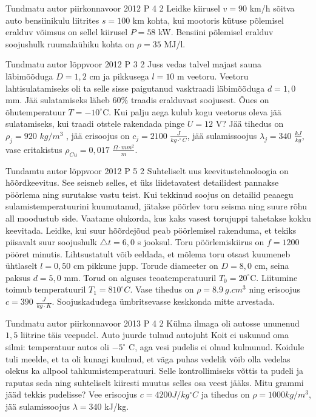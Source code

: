 \documentclass[11pt]{article}
\begin{document}
{%
{Tundmatu autor} %
{piirkonnavoor} %
{2012} %
{P 4} %
{2} %
{
\ifStatement
Leidke kiirusel $v = 90$ km/h sõitva auto bensiinikulu liitrites $s = 100$ km kohta, kui mootoris kütuse põlemisel eralduv  võimsus on sellel kiirusel $P = 58$ kW. Bensiini põlemisel eralduv soojushulk ruumalaühiku kohta on $\rho = 35$ MJ/l.
\fi
}

{Tundmatu autor} %
{lõppvoor} %
{2012} %
{P 3} %
{2} %
{
\ifStatement
Juss vedas talvel majast sauna läbimõõduga $D = 1,2$ cm ja pikkusega $l = 10$ m veetoru. Veetoru lahtisulatamiseks oli ta selle sisse paigutanud vasktraadi läbimõõduga $d = 1,0$ mm. Jää sulatamiseks läheb $60\%$ traadis eralduvast soojusest. Õues on õhutemperatuur $T = -10^{\circ}$C. Kui palju aega kulub kogu veetorus oleva jää sulatamiseks, kui traadi otstele rakendada pinge $U = 12$ V? Jää tihedus on $\rho_j = 920 $ $kg/m^3$ , jää erisoojus on $c_j = 2100$ $\frac{J}{kg \cdot ^{\circ} C}$, jää sulamissoojus $\lambda_j = 340$ $\frac{kJ}{kg}$, vase eritakistus $\rho_{Cu} = 0,017$ $\frac{\Omega \cdot mm^2}{m}$.
\fi
}

{Tundamtu autor} %
{lõppvoor} %
{2012} %
{P 5} %
{2} %
{
\ifStatement
Suhteliselt uus keevitustehnoloogia on hõõrdkeevitus. See seisneb selles, et üks liidetavatest detailidest pannakse pöörlema ning surutakse vastu teist. Kui tekkinud soojus on detailid peaaegu sulamistemperatuurini kuumutanud, jätakse pöörlev toru seisma ning suure rõhu all moodustub side. Vaatame olukorda, kus kaks vasest torujuppi tahetakse kokku keevitada. Leidke, kui suur hõõrdejõud peab pöörlemisel rakenduma, et tekiks piisavalt suur soojushulk $\triangle t = 6,0$ s jooksul. Toru pöörlemiskiirus on $f = 1200$ pööret minutis. Lihtsustatult võib eeldada, et mõlema toru otsast kuumeneb ühtlaselt $l = 0,50$ cm pikkune jupp. Torude diameeter on $D = 8,0$ cm, seina paksus $d = 5,0$ mm. Torud on alguses teoatemperatuuril $T_0 = 20^{\circ}$C. Liitumine toimub temperatuuril $T_1 = 810^{\circ}C$. Vase tihedus on $\rho = \SI{8.9}{g.cm^3}$ ning erisoojus $c = 390$ $\frac{J}{kg \cdot K}$. Soojuskadudega ümbritsevasse keskkonda mitte arvestada. 
\fi
}

{Tundmatu autor} %
{piirkonnavoor} %
{2013} %
{P 4} %
{2} %
{
\ifStatement
Külma ilmaga oli autosse ununenud $1,5$ liitrine täis veepudel. Auto juurde tulnud autojuht Koit ei uskunud oma silmi: temperatuur autos oli $-5 ^{\circ}$ C, aga vesi pudelis ei olnud kulmunud. Koidule tuli meelde, et ta oli kunagi kuulnud, et väga puhas vedelik võib olla vedelas olekus ka allpool tahkumistemperatuuri. Selle kontrollimiseks võttis ta pudeli ja raputas seda ning suhteliselt kiiresti muutus selles osa veest jääks. Mitu grammi jääd tekkis pudelisse? Vee erisoojus $c = 4200 J/kg^{\circ}C$ ja tihedus on $\rho = 1000 kg/m^3$, jää sulamissoojus $\lambda = 340$ kJ/kg.
\fi
}

}
\end{document}
